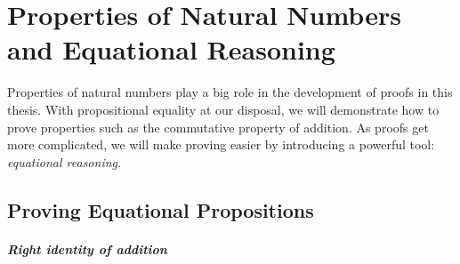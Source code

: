 \documentclass[../thesis.tex]{subfiles}
\begin{document}
\chapter{Properties of Natural Numbers and Equational Reasoning}\label{eq-reasoning}

%
%





Properties of natural numbers play a big role in the development of proofs in
this thesis. With propositional equality at our disposal, we will demonstrate how
to prove properties such as the commutative property of addition.
As proofs get more complicated, we will make proving easier by introducing a
powerful tool: \textit{equational reasoning}.

\section{Proving Equational Propositions}

\paragraph{Right identity of addition}
\end{document}

